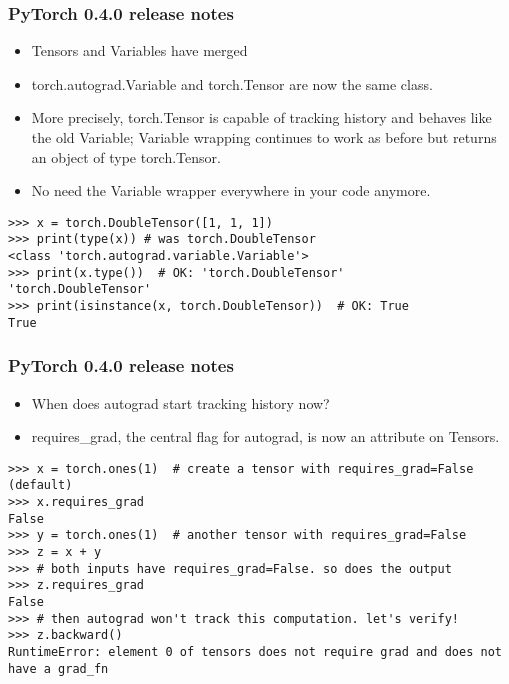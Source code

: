  
\begin{frame}[fragile]
\frametitle{PyTorch 0.4.0 release notes}
\begin{itemize}
\item Tensors and Variables have merged
\item torch.autograd.Variable and torch.Tensor are now the same class. 
\item More precisely, torch.Tensor is capable of tracking history and behaves like the old Variable; Variable wrapping continues to work as before but returns an object of type torch.Tensor. \item No need the Variable wrapper everywhere in your code anymore.
\end{itemize}
 \begin{lstlisting}
>>> x = torch.DoubleTensor([1, 1, 1])
>>> print(type(x)) # was torch.DoubleTensor
<class 'torch.autograd.variable.Variable'>
>>> print(x.type())  # OK: 'torch.DoubleTensor'
'torch.DoubleTensor'
>>> print(isinstance(x, torch.DoubleTensor))  # OK: True
True
 \end{lstlisting}
 \end{frame} 
 
\begin{frame}[fragile]
\frametitle{PyTorch 0.4.0 release notes}

\begin{itemize}
\item When does autograd start tracking history now?
\item requires\_grad, the central flag for autograd, is now an attribute on Tensors.
\end{itemize}
 \begin{lstlisting}
>>> x = torch.ones(1)  # create a tensor with requires_grad=False (default)
>>> x.requires_grad
False
>>> y = torch.ones(1)  # another tensor with requires_grad=False
>>> z = x + y
>>> # both inputs have requires_grad=False. so does the output
>>> z.requires_grad
False
>>> # then autograd won't track this computation. let's verify!
>>> z.backward()
RuntimeError: element 0 of tensors does not require grad and does not have a grad_fn
 \end{lstlisting}
 \end{frame} 
 
